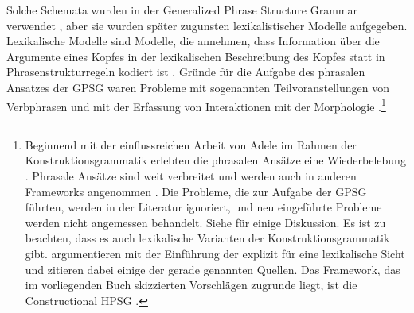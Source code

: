 \noindent
Solche Schemata wurden in der Generalized Phrase Structure Grammar verwendet \citep*{GKPS85a,Uszkoreit87a}, aber sie wurden
später zugunsten lexikalistischer Modelle aufgegeben. Lexikalische Modelle sind Modelle, die annehmen, dass Information über die
Argumente eines Kopfes in der lexikalischen Beschreibung des Kopfes statt in Phrasenstrukturregeln
kodiert ist \parencites{Jacobson87b}[Abschnitt~5.5]{MuellerGT-Eng1}{MWArgSt}. Gründe für die Aufgabe des phrasalen
Ansatzes der GPSG waren Probleme mit sogenannten Teilvoranstellungen von Verbphrasen \citep{Nerbonne86a,Johnson86a} und mit der Erfassung von
Interaktionen mit der Morphologie \citep[Abschnitt~5.5.1]{MuellerGT-Eng1}.\footnote{%
  Beginnend mit der einflussreichen Arbeit von Adele \citet{Goldberg95a} im Rahmen der Konstruktionsgrammatik\indexcxg{} erlebten die phrasalen Ansätze eine Wiederbelebung \citep{GJ2004a}. Phrasale Ansätze sind weit verbreitet
  und werden auch in anderen Frameworks angenommen
\citep{Haugereid2007a,Haugereid2009a,CJ2005a,CulicoverVaraschin2025a-u,Alsina96a,Christie2010a,%
ADT2008a,ADT2013a}.            %
Die Probleme, die zur Aufgabe der GPSG führten, werden
  in der Literatur ignoriert, und neu eingeführte Probleme werden nicht angemessen behandelt. Siehe
  \cites{Mueller2006d,MuellerPersian,MuellerUnifying,MWArgSt,MWArgStReply,MuellerFCG,MuellerLFGphrasal,MuellerPotentialStructure,MuellerGT-Eng,MuellerCxG}
  für einige Diskussion. Es ist zu beachten, dass es auch lexikalische Varianten der Konstruktionsgrammatik gibt. \citet*{SBK2012a} argumentieren mit der Einführung der \sbcg{} explizit für eine
  lexikalische Sicht und zitieren dabei einige der gerade genannten Quellen. Das Framework, das im vorliegenden Buch
  skizzierten Vorschlägen zugrunde liegt, ist die Constructional HPSG \citep*{Sag97a,HPSGHandbook}.
}


